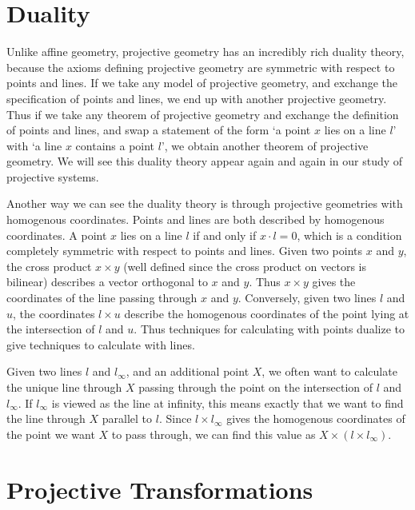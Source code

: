 \section{Duality}

Unlike affine geometry, projective geometry has an incredibly rich duality theory, because the axioms defining projective geometry are symmetric with respect to points and lines. If we take any model of projective geometry, and exchange the specification of points and lines, we end up with another projective geometry. Thus if we take any theorem of projective geometry and exchange the definition of points and lines, and swap a statement of the form `a point $x$ lies on a line $l$' with `a line $x$ contains a point $l$', we obtain another theorem of projective geometry. We will see this duality theory appear again and again in our study of projective systems.

Another way we can see the duality theory is through projective geometries with homogenous coordinates. Points and lines are both described by homogenous coordinates. A point $x$ lies on a line $l$ if and only if $x \cdot l = 0$, which is a condition completely symmetric with respect to points and lines. Given two points $x$ and $y$, the cross product $x \times y$ (well defined since the cross product on vectors is bilinear) describes a vector orthogonal to $x$ and $y$. Thus $x \times y$ gives the coordinates of the line passing through $x$ and $y$. Conversely, given two lines $l$ and $u$, the coordinates $l \times u$ describe the homogenous coordinates of the point lying at the intersection of $l$ and $u$. Thus techniques for calculating with points dualize to give techniques to calculate with lines.

\begin{example}
    Given two lines $l$ and $l_\infty$, and an additional point $X$, we often want to calculate the unique line through $X$ passing through the point on the intersection of $l$ and $l_\infty$. If $l_\infty$ is viewed as the line at infinity, this means exactly that we want to find the line through $X$ parallel to $l$. Since $l \times l_\infty$ gives the homogenous coordinates of the point we want $X$ to pass through, we can find this value as $X \times (l \times l_\infty)$.
\end{example}

\section{Projective Transformations}

